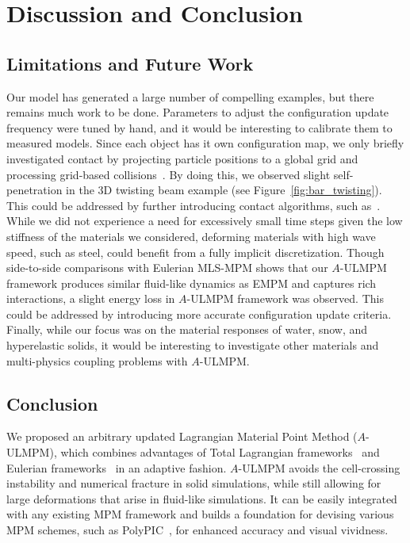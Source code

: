 \section{Discussion and Conclusion}
\label{sec:conclusion}

\subsection{Limitations and Future Work} 
Our model has generated a large number of compelling examples, but there remains much work to be done. Parameters to adjust the configuration update frequency were tuned by hand, and it would be interesting to calibrate them to measured models. Since each object has it own configuration map, we only briefly investigated contact by projecting particle positions to a global grid and processing grid-based collisions~\cite{Stomakhin:2013:MPMsnow}. By doing this, we observed slight self-penetration in the 3D twisting beam example (see Figure~\ref{fig:bar_twisting}). This could be addressed by further introducing contact algorithms, such as~\cite{Jiang:2017:Anisotropic, Han:2019:Hybrid}.
While we did not experience a need for excessively small time steps given the low stiffness of the materials we considered, deforming materials with high wave speed, such as steel, could benefit from a fully implicit discretization.
Though side-to-side comparisons with Eulerian MLS-MPM shows that our $A$-ULMPM framework produces similar fluid-like dynamics as EMPM and captures rich interactions, a slight energy loss in $A$-ULMPM framework was observed. 
This could be addressed by introducing more accurate configuration update criteria. 
Finally, while our focus was on the material responses of water, snow, and hyperelastic solids, it would be interesting to investigate other materials and multi-physics coupling problems with $A$-ULMPM. 

\subsection{Conclusion}
We proposed an arbitrary updated Lagrangian Material Point Method ($A$-ULMPM), which combines advantages of Total Lagrangian frameworks~\cite{De:2021:TLMPM,De:2020:TLMPM} and Eulerian frameworks~\cite{Stomakhin:2013:MPMsnow, Hu:2018:Moving} in an adaptive fashion. $A$-ULMPM avoids the cell-crossing instability and numerical fracture in solid simulations, while still allowing for large deformations that arise in fluid-like simulations. 
It can be easily integrated with any existing MPM framework and builds a foundation for devising various MPM schemes, such as PolyPIC~\cite{Fu:2017:PolyPIC}, for enhanced accuracy and visual vividness. 


